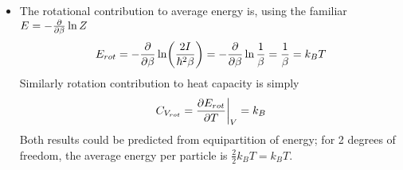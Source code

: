 \documentclass[11pt, a4paper]{article}
\begin{document}
\begin{itemize}
	\item The rotational contribution to average energy is, using the familiar $ E = -\pdv{}{\beta} \ln Z $
	\begin{equation*}
		E_{rot} = - \pdv{}{\beta} \ln(\frac{2I}{\hbar^{2} \beta}) = -\pdv{}{\beta} \ln \frac{1}{\beta} = \frac{1}{\beta} = k_{B}T
	\end{equation*}
	Similarly rotation contribution to heat capacity is simply
	\begin{equation*}
		C_{V_{rot}} = \pdv{E_{rot}}{T} \bigg |_{V} = k_{B}
	\end{equation*}
	Both results could be predicted from equipartition of energy; for 2 degrees of freedom, the average energy per particle is $ \frac{2}{2}k_{B}T = k_{B}T $.
	
\end{itemize}
\end{document}
